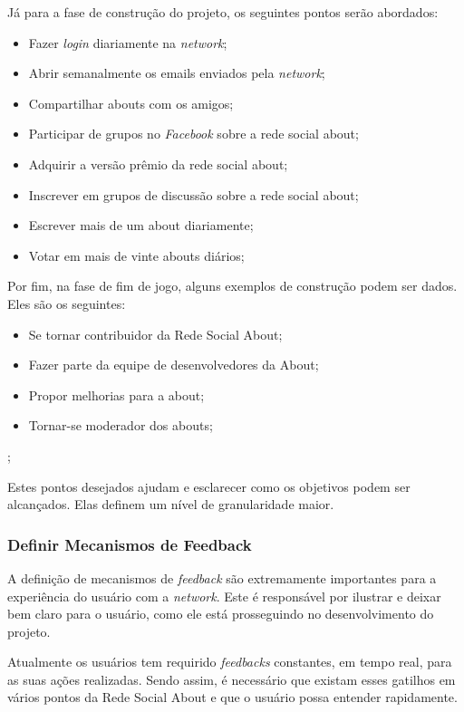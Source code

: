 Já para a fase de construção do projeto, os seguintes pontos serão
abordados:

\begin{itemize}
    \item Fazer \textit{login} diariamente na \textit{network};
    \item Abrir semanalmente os emails enviados pela \textit{network};
    \item Compartilhar abouts com os amigos;
    \item Participar de grupos no \textit{Facebook} sobre a rede social about;
    \item Adquirir a versão prêmio da rede social about;
    \item Inscrever em grupos de discussão sobre a rede social about;
    \item Escrever mais de um about diariamente;
    \item Votar em mais de vinte abouts diários;
\end{itemize}

Por fim, na fase de fim de jogo, alguns exemplos de construção podem ser dados. Eles são os seguintes:
\begin{itemize}
    \item Se tornar contribuidor da Rede Social About;
    \item Fazer parte da equipe de desenvolvedores da About;
    \item Propor melhorias para a about;
    \item Tornar-se moderador dos abouts;
\end{itemize};

Estes pontos desejados ajudam e esclarecer como os objetivos podem ser alcançados. Elas 
definem um nível de granularidade maior.

\subsubsection{Definir Mecanismos de Feedback}
\label{sub:define_feedback_mechanics}
A definição de mecanismos de \textit{feedback} são extremamente importantes para a experiência 
do usuário
com a \textit{network}. Este é responsável por ilustrar e deixar bem claro para o usuário, como 
ele está prosseguindo no desenvolvimento do projeto.

Atualmente os usuários tem requirido \textit{feedbacks} constantes, em tempo real, para as suas 
ações
realizadas. Sendo assim, é necessário que existam esses gatilhos em vários pontos da
Rede Social About e que o usuário possa entender rapidamente.

